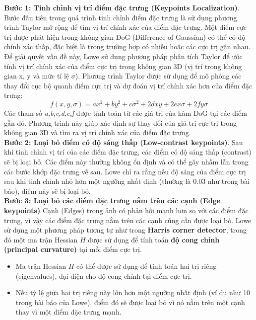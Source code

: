 \textbf{Bước 1: Tinh chỉnh vị trí điểm đặc trưng (Keypoints Localization)}. Bước đầu tiên trong quá trình tinh chỉnh điểm đặc trưng là sử dụng phương trình Taylor mở rộng để tìm vị trí chính xác của điểm đặc trưng. Một điểm cực trị được phát hiện trong không gian DoG (Difference of Gaussian) có thể có độ chính xác thấp, đặc biệt là trong trường hợp có nhiễu hoặc các cực trị gần nhau. Để giải quyết vấn đề này, Lowe sử dụng phương pháp phân tích Taylor để ước tính vị trí chính xác của điểm cực trị trong không gian 3D (vị trí trong không gian x, y và mức tỉ lệ $\sigma$). Phương trình Taylor được sử dụng để mô phỏng các thay đổi cục bộ quanh điểm cực trị và dự đoán vị trí chính xác hơn của điểm đặc trưng:
\[ f(x,y,\sigma)=ax^{2}+by^{2}+c\sigma^{2}+2dxy+2ex\sigma+2fy\sigma \]
Các tham số \textit{a,b,c,d,e,f} được tính toán từ các giá trị của hàm DoG tại các điểm gần đó. Phương trình này giúp xác định sự thay đổi của giá trị cực trị trong không gian 3D và tìm ra vị trí chính xác của điểm đặc trưng.\\

\textbf{Bước 2: Loại bỏ điểm có độ sáng thấp (Low-contrast keypoints)}. Sau khi tinh chỉnh vị trí của các điểm đặc trưng, các điểm có độ sáng thấp (contrast) sẽ bị loại bỏ. Các điểm này thường không ổn định và có thể gây nhầm lẫn trong các bước khớp đặc trưng về sau. Lowe chỉ ra rằng nếu độ sáng của điểm cực trị sau khi tinh chỉnh nhỏ hơn một ngưỡng nhất định (thường là 0.03 như trong bài báo), điểm này sẽ bị loại bỏ.\\

\textbf{Bước 3: Loại bỏ các điểm đặc trưng nằm trên các cạnh (Edge keypoints)}
Cạnh (Edges) trong ảnh có phản hồi mạnh hơn so với các điểm đặc trưng, vì vậy các điểm đặc trưng nằm trên các cạnh cũng cần được loại bỏ. Lowe sử dụng một phương pháp tương tự như trong \textbf{Harris corner detector}, trong đó một ma trận Hessian \( H \) được sử dụng để tính toán \textbf{độ cong chính (principal curvature)} tại mỗi điểm cực trị.

\begin{itemize}
	\item Ma trận Hessian \( H \) có thể được sử dụng để tính toán hai trị riêng (eigenvalues), đại diện cho độ cong chính tại điểm cực trị.
	\item Nếu tỷ lệ giữa hai trị riêng này lớn hơn một ngưỡng nhất định (ví dụ như 10 trong bài báo của Lowe), điểm đó sẽ được loại bỏ vì nó nằm trên một cạnh thay vì một điểm đặc trưng mạnh.
\end{itemize}

